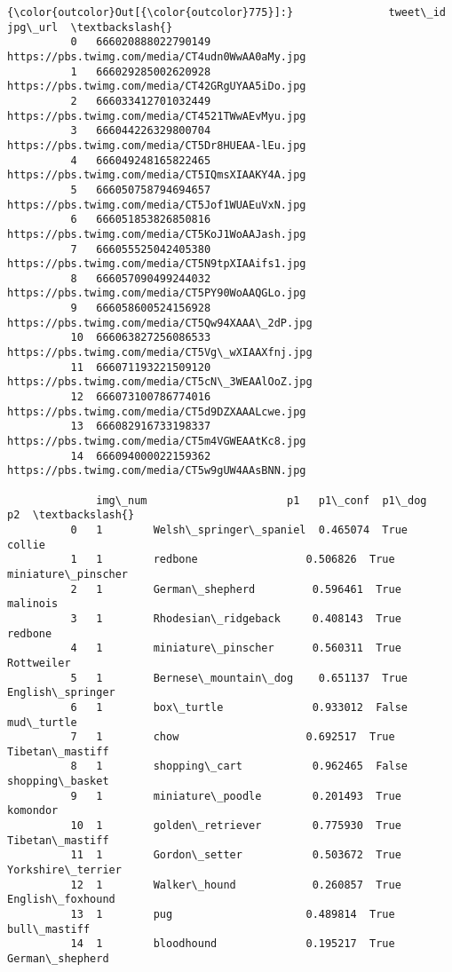 \documentclass[11pt]{article}
\begin{document}
\begin{Verbatim}[commandchars=\\\{\}]
{\color{outcolor}Out[{\color{outcolor}775}]:}               tweet\_id                                          jpg\_url  \textbackslash{}
          0   666020888022790149  https://pbs.twimg.com/media/CT4udn0WwAA0aMy.jpg   
          1   666029285002620928  https://pbs.twimg.com/media/CT42GRgUYAA5iDo.jpg   
          2   666033412701032449  https://pbs.twimg.com/media/CT4521TWwAEvMyu.jpg   
          3   666044226329800704  https://pbs.twimg.com/media/CT5Dr8HUEAA-lEu.jpg   
          4   666049248165822465  https://pbs.twimg.com/media/CT5IQmsXIAAKY4A.jpg   
          5   666050758794694657  https://pbs.twimg.com/media/CT5Jof1WUAEuVxN.jpg   
          6   666051853826850816  https://pbs.twimg.com/media/CT5KoJ1WoAAJash.jpg   
          7   666055525042405380  https://pbs.twimg.com/media/CT5N9tpXIAAifs1.jpg   
          8   666057090499244032  https://pbs.twimg.com/media/CT5PY90WoAAQGLo.jpg   
          9   666058600524156928  https://pbs.twimg.com/media/CT5Qw94XAAA\_2dP.jpg   
          10  666063827256086533  https://pbs.twimg.com/media/CT5Vg\_wXIAAXfnj.jpg   
          11  666071193221509120  https://pbs.twimg.com/media/CT5cN\_3WEAAlOoZ.jpg   
          12  666073100786774016  https://pbs.twimg.com/media/CT5d9DZXAAALcwe.jpg   
          13  666082916733198337  https://pbs.twimg.com/media/CT5m4VGWEAAtKc8.jpg   
          14  666094000022159362  https://pbs.twimg.com/media/CT5w9gUW4AAsBNN.jpg   
          
              img\_num                      p1   p1\_conf  p1\_dog                  p2  \textbackslash{}
          0   1        Welsh\_springer\_spaniel  0.465074  True    collie               
          1   1        redbone                 0.506826  True    miniature\_pinscher   
          2   1        German\_shepherd         0.596461  True    malinois             
          3   1        Rhodesian\_ridgeback     0.408143  True    redbone              
          4   1        miniature\_pinscher      0.560311  True    Rottweiler           
          5   1        Bernese\_mountain\_dog    0.651137  True    English\_springer     
          6   1        box\_turtle              0.933012  False   mud\_turtle           
          7   1        chow                    0.692517  True    Tibetan\_mastiff      
          8   1        shopping\_cart           0.962465  False   shopping\_basket      
          9   1        miniature\_poodle        0.201493  True    komondor             
          10  1        golden\_retriever        0.775930  True    Tibetan\_mastiff      
          11  1        Gordon\_setter           0.503672  True    Yorkshire\_terrier    
          12  1        Walker\_hound            0.260857  True    English\_foxhound     
          13  1        pug                     0.489814  True    bull\_mastiff         
          14  1        bloodhound              0.195217  True    German\_shepherd      
          

\end{Verbatim}
\end{document}
